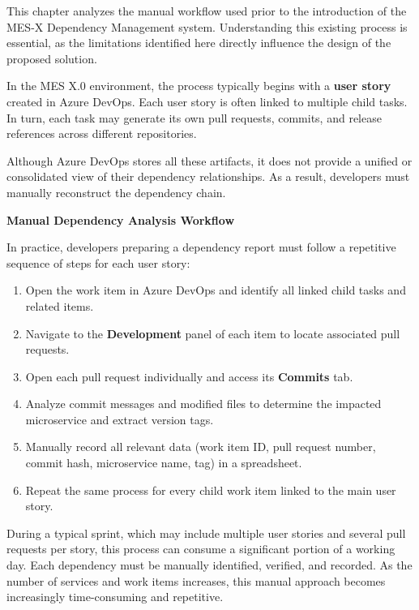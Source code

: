 This chapter analyzes the manual workflow used prior to the introduction of the
MES-X Dependency Management system. Understanding this existing process is
essential, as the limitations identified here directly influence the design of
the proposed solution.

In the MES X.0 environment, the process typically begins with a
\textbf{user story} created in Azure DevOps. Each user story is often linked to
multiple child tasks. In turn, each task may generate its own pull requests,
commits, and release references across different repositories.

Although Azure DevOps stores all these artifacts, it does not provide a unified
or consolidated view of their dependency relationships. As a result, developers
must manually reconstruct the dependency chain.

\vspace{0.3cm}
\textbf{Manual Dependency Analysis Workflow}

In practice, developers preparing a dependency report must follow a repetitive
sequence of steps for each user story:

\begin{enumerate}
\item Open the work item in Azure DevOps and identify all linked child tasks and related items.
\item Navigate to the \textbf{Development} panel of each item to locate associated pull requests.
\item Open each pull request individually and access its \textbf{Commits} tab.
\item Analyze commit messages and modified files to determine the impacted microservice and extract version tags.
\item Manually record all relevant data (work item ID, pull request number, commit hash, microservice name, tag) in a spreadsheet.
\item Repeat the same process for every child work item linked to the main user story.
\end{enumerate}

\vspace{0.3cm}
During a typical sprint, which may include multiple user stories and several
pull requests per story, this process can consume a significant portion of a
working day. Each dependency must be manually identified, verified, and recorded.
As the number of services and work items increases, this manual approach becomes
increasingly time-consuming and repetitive.



